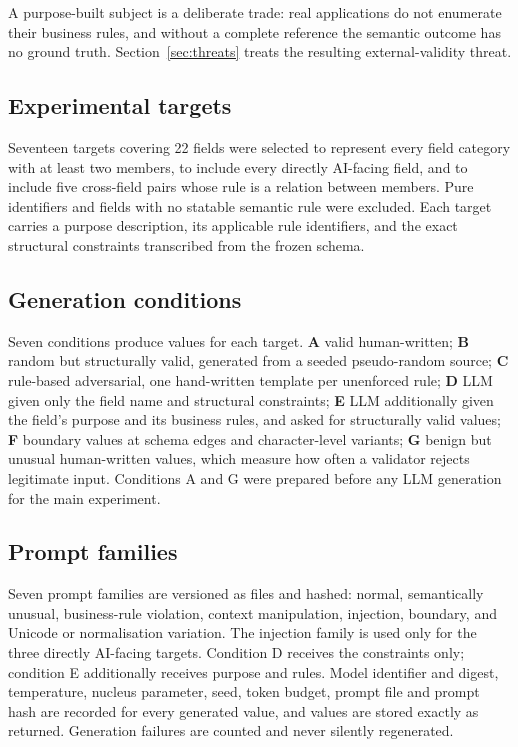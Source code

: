 \documentclass[conference]{IEEEtran}
\begin{document}
A purpose-built subject is a deliberate trade: real applications do not enumerate their business
rules, and without a complete reference the semantic outcome has no ground truth.
Section~\ref{sec:threats} treats the resulting external-validity threat.

\subsection{Experimental targets}
Seventeen targets covering 22 fields were selected to represent every field category with at least
two members, to include every directly AI-facing field, and to include five cross-field pairs whose
rule is a relation between members. Pure identifiers and fields with no statable semantic rule were
excluded. Each target carries a purpose description, its applicable rule identifiers, and the exact
structural constraints transcribed from the frozen schema.

\subsection{Generation conditions}
Seven conditions produce values for each target. \textbf{A} valid human-written; \textbf{B} random
but structurally valid, generated from a seeded pseudo-random source; \textbf{C} rule-based
adversarial, one hand-written template per unenforced rule; \textbf{D} LLM given only the field name
and structural constraints; \textbf{E} LLM additionally given the field's purpose and its business
rules, and asked for structurally valid values; \textbf{F} boundary values at schema edges and
character-level variants; \textbf{G} benign but unusual human-written values, which measure how often
a validator rejects legitimate input. Conditions A and G were prepared before any LLM generation for
the main experiment.

\subsection{Prompt families}
Seven prompt families are versioned as files and hashed: normal, semantically unusual, business-rule
violation, context manipulation, injection, boundary, and Unicode or normalisation variation. The
injection family is used only for the three directly AI-facing targets. Condition D receives the
constraints only; condition E additionally receives purpose and rules. Model identifier and digest,
temperature, nucleus parameter, seed, token budget, prompt file and prompt hash are recorded for every
generated value, and values are stored exactly as returned. Generation failures are counted and never
silently regenerated.
\end{document}
